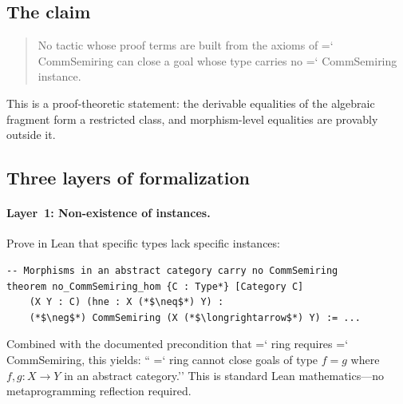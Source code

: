\documentclass[11pt]{article}
\renewcommand{\texttt}[1]{%
  \begingroup\ttfamily\hyphenchar\font=`\-\relax
  \def\_{\textunderscore\discretionary{}{}{}}%
  #1\endgroup}
\theoremstyle{definition}
\theoremstyle{remark}
\begin{document}
\subsection{The claim}

\begin{quote}
No tactic whose proof terms are built from the axioms of
\texttt{CommSemiring} can close a goal whose type carries no
\texttt{CommSemiring} instance.
\end{quote}

\noindent This is a proof-theoretic statement: the derivable
equalities of the algebraic fragment form a restricted class, and
morphism-level equalities are provably outside it.

\subsection{Three layers of formalization}

\paragraph{Layer~1: Non-existence of instances.}
Prove in Lean that specific types lack specific instances:
\begin{lstlisting}
-- Morphisms in an abstract category carry no CommSemiring
theorem no_CommSemiring_hom {C : Type*} [Category C]
    (X Y : C) (hne : X (*$\neq$*) Y) :
    (*$\neg$*) CommSemiring (X (*$\longrightarrow$*) Y) := ...
\end{lstlisting}
Combined with the documented precondition that \texttt{ring}
requires \texttt{CommSemiring}, this yields: ``\texttt{ring} cannot
close goals of type $f = g$ where $f, g : X \longrightarrow Y$ in
an abstract category.''  This is standard Lean mathematics---no
metaprogramming reflection required.
\end{document}

